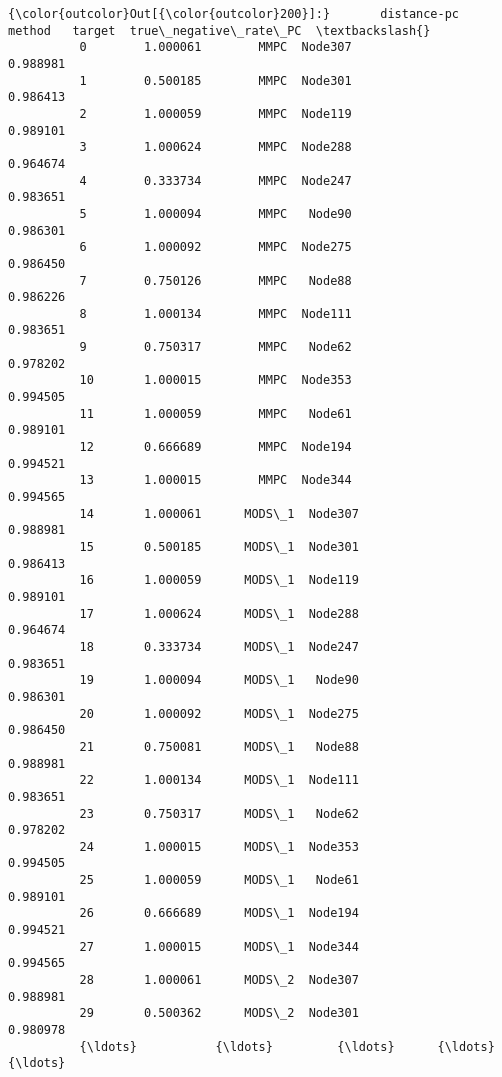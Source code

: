 \documentclass[11pt]{article}
\begin{document}
\begin{Verbatim}[commandchars=\\\{\}]
{\color{outcolor}Out[{\color{outcolor}200}]:}       distance-pc      method   target  true\_negative\_rate\_PC  \textbackslash{}
          0        1.000061        MMPC  Node307               0.988981   
          1        0.500185        MMPC  Node301               0.986413   
          2        1.000059        MMPC  Node119               0.989101   
          3        1.000624        MMPC  Node288               0.964674   
          4        0.333734        MMPC  Node247               0.983651   
          5        1.000094        MMPC   Node90               0.986301   
          6        1.000092        MMPC  Node275               0.986450   
          7        0.750126        MMPC   Node88               0.986226   
          8        1.000134        MMPC  Node111               0.983651   
          9        0.750317        MMPC   Node62               0.978202   
          10       1.000015        MMPC  Node353               0.994505   
          11       1.000059        MMPC   Node61               0.989101   
          12       0.666689        MMPC  Node194               0.994521   
          13       1.000015        MMPC  Node344               0.994565   
          14       1.000061      MODS\_1  Node307               0.988981   
          15       0.500185      MODS\_1  Node301               0.986413   
          16       1.000059      MODS\_1  Node119               0.989101   
          17       1.000624      MODS\_1  Node288               0.964674   
          18       0.333734      MODS\_1  Node247               0.983651   
          19       1.000094      MODS\_1   Node90               0.986301   
          20       1.000092      MODS\_1  Node275               0.986450   
          21       0.750081      MODS\_1   Node88               0.988981   
          22       1.000134      MODS\_1  Node111               0.983651   
          23       0.750317      MODS\_1   Node62               0.978202   
          24       1.000015      MODS\_1  Node353               0.994505   
          25       1.000059      MODS\_1   Node61               0.989101   
          26       0.666689      MODS\_1  Node194               0.994521   
          27       1.000015      MODS\_1  Node344               0.994565   
          28       1.000061      MODS\_2  Node307               0.988981   
          29       0.500362      MODS\_2  Node301               0.980978   
          {\ldots}           {\ldots}         {\ldots}      {\ldots}                    {\ldots}   

\end{Verbatim}
\end{document}
